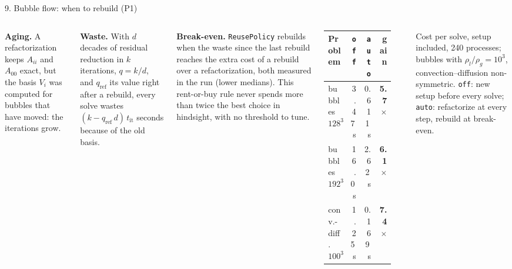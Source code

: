 \documentclass[aspectratio=169,10pt]{beamer}
\newcommand{\code}[1]{\texttt{#1}}
\newcommand{\muted}[1]{{\color{ink2}#1}}
\newcommand{\good}[1]{{\color{schwarz!85!black}\textbf{#1}}}
\newcommand\Wextra{{-81}{-19}{17}{9}}
\newcommand\mapsec[2]{\expandafter\cmsection#1{#2}}
\newcommand\mapbadge[1]{%
  \begin{tikzpicture}[remember picture,overlay]
    \node[anchor=north east,fill=white,rounded corners=1.2pt,inner sep=0.9pt]
      at ($(current page.north east)+(-1.8mm,-0.75mm)$) {\expandafter\cmthumb#1{17mm}};
  \end{tikzpicture}}
\begin{document}
\begin{frame}{9. Bubble flow: when to rebuild (P1)}
  \begin{columns}[c,onlytextwidth]
    \small\setlength{\parskip}{6pt}%
    \textbf{\color{schwarz}Aging.} A refactorization keeps $A_{ii}$ and $A_{00}$ exact, but the basis $V_i$
    was computed for bubbles that have moved: the iterations grow.

    \textbf{\color{schwarz}Waste.} With $d$ decades of residual reduction in $k$ iterations, $q=k/d$, and
    $q_{\mathrm{ref}}$ its value right after a rebuild, every solve wastes
    $(k-q_{\mathrm{ref}}\,d)\,t_{\mathrm{it}}$ seconds because of the old basis.

    \textbf{\color{schwarz}Break-even.} \code{ReusePolicy} rebuilds when the waste since the last rebuild
    reaches the extra cost of a rebuild over a refactorization, both \alert{measured} in the run (lower
    medians). This rent-or-buy rule never spends more than twice the best choice in hindsight, with no
    threshold to tune.
    \centering\footnotesize
    \begin{tabular}{@{}lrrr@{}}
      \toprule
      Problem & \code{off} & \code{auto} & gain\\
      \midrule
      bubbles $128^3$ & 3.47\,s & 0.611\,s & \good{5.7$\times$}\\
      bubbles $192^3$ & 16.0\,s & 2.62\,s & \good{6.1$\times$}\\
      conv.-diff.\ $100^3$ & 1.25\,s & 0.169\,s & \good{7.4$\times$}\\
      \bottomrule
    \end{tabular}\\[1.5mm]
    \begin{minipage}{\linewidth}\scriptsize\muted{Cost per solve, setup included, 240 processes; bubbles with $\rho_l/\rho_g=10^3$,
    convection--diffusion non-symmetric.
    \code{off}: new setup before every solve; \code{auto}: refactorize at every step, rebuild at
    break-even.}\end{minipage}\par\vspace{3mm}
    \noindent\mapsec\Wextra{0.97\linewidth}
  \end{columns}
\end{frame}
\end{document}
